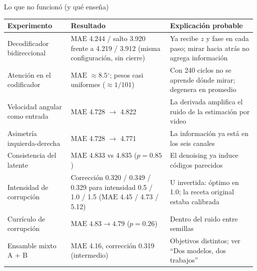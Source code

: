 \documentclass[aspectratio=169,10pt,t]{beamer}
\newcommand{\gr}{$^\circ$}
\newcommand{\mae}{\ensuremath{\mathrm{MAE}}}
\begin{document}
\begin{frame}{Lo que no funcionó (y qué enseña)}
\scriptsize
\renewcommand{\arraystretch}{1.12}
\begin{tabularx}{\textwidth}{@{}>{\raggedright\arraybackslash}p{3.2cm}>{\raggedright\arraybackslash}X>{\raggedright\arraybackslash}p{4.6cm}@{}}
\toprule
\textbf{Experimento} & \textbf{Resultado} & \textbf{Explicación probable}\\
\midrule
Decodificador bidireccional & \mae{} 4.244 / salto 3.920 frente a 4.219 / 3.912 (misma configuración, sin cierre) & Ya recibe $z$ y fase en cada paso; mirar hacia atrás no agrega información\\
Atención en el codificador & \mae{} $\approx8.5$\gr; pesos casi uniformes ($\approx1/101$) & Con 240 ciclos no se aprende dónde mirar; degenera en promedio\\
Velocidad angular como entrada & \mae{} 4.728 $\to$ 4.822 & La derivada amplifica el ruido de la estimación por video\\
Asimetría izquierda-derecha & \mae{} 4.728 $\to$ 4.771 & La información ya está en los seis canales\\
Consistencia del latente & \mae{} 4.833 vs 4.835 ($p=0.85$) & El denoising ya induce códigos parecidos\\
Intensidad de corrupción & Corrección 0.320 / 0.349 / 0.329 para intensidad 0.5 / 1.0 / 1.5 (\mae{} 4.45 / 4.73 / 5.12) & U invertida: óptimo en 1.0; la receta original estaba calibrada\\
Currículo de corrupción & \mae{} $4.83\to4.79$ ($p=0.26$) & Dentro del ruido entre semillas\\
Ensamble mixto A + B & \mae{} 4.16, corrección 0.319 (intermedio) & Objetivos distintos; ver ``Dos modelos, dos trabajos''\\
\bottomrule
\end{tabularx}
\end{frame}
\end{document}
